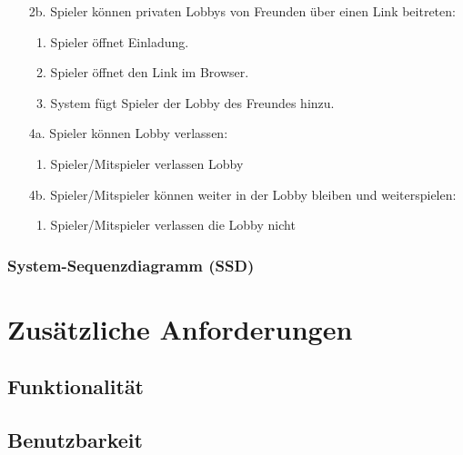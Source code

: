 \documentclass[11pt,ngerman]{article}
\begin{document}
\begin{tcolorbox}[breakable,sharp corners,colback=white,colframe=gray,width=\dimexpr\textwidth-15mm\relax,enlarge left by=10mm,fontupper=\linespread{1.1}\selectfont]
\begin{itemize}
                    \item[2b.] Spieler können privaten Lobbys von Freunden über einen Link beitreten:
                        \begin{enumerate}
                            \item Spieler öffnet Einladung.
                            \item Spieler öffnet den Link im Browser.
                            \item System fügt Spieler der Lobby des Freundes hinzu.
                        \end{enumerate}
                    \item[4a.] Spieler können Lobby verlassen:
                        \begin{enumerate}
                            \item Spieler/Mitspieler verlassen Lobby
                        \end{enumerate}
                    \item[4b.] Spieler/Mitspieler können weiter in der Lobby bleiben und weiterspielen:
                        \begin{enumerate}
                            \item Spieler/Mitspieler verlassen die Lobby nicht
                        \end{enumerate}
                \end{itemize}

            \end{tcolorbox}

         \subsubsection{System-Sequenzdiagramm (SSD)}

    \section{Zusätzliche Anforderungen}

    \subsection{Funktionalität}


    \subsection{Benutzbarkeit}
\end{document}
